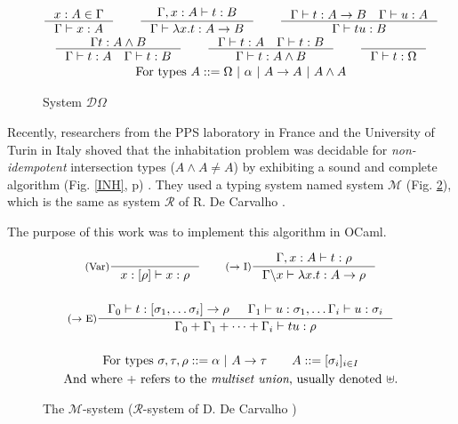 \documentclass{article}
\begin{document}
\begin{figure}
    \begin{mdframed}
        \begin{gather*}
        \inference[]{x : A \in \Gamma}{\Gamma \vdash x : A}
        \qquad
        \inference[]{\Gamma, x : A \vdash t : B}{\Gamma \vdash \lambda x.t : A \rightarrow B}
        \qquad
        \inference[]{\Gamma \vdash t : A \rightarrow B \quad \Gamma \vdash u : A}{\Gamma \vdash tu : B}
        \\
        \inference[]{\Gamma t : A \wedge B}{\Gamma \vdash t : A \quad \Gamma \vdash t : B}
        \qquad
        \inference[]{\Gamma \vdash t : A \quad \Gamma \vdash t : B}{\Gamma \vdash t : A \wedge B}
        \qquad
        \inference[]{}{\Gamma \vdash t : \Omega}
        \\ \text{For types } A ::= \Omega \ | \ \alpha \ | \ A \rightarrow A \ | \ A \wedge A
        \end{gather*}
    \end{mdframed}
    \caption{System $\mathcal{D}\Omega$}
    \label{SDO}
\end{figure}

Recently, researchers from the PPS laboratory in France and the University of Turin in Italy shoved that the inhabitation problem was decidable for \emph{non-idempotent} intersection types ($A\wedge A\neq A$) by exhibiting a sound and complete algorithm (Fig. \ref{INH}, p\pageref{INH}) \cite{Kes}. They used a typing system named system $\mathcal{M}$ (Fig. \ref{SM}), which is the same as system $\mathcal{R}$ of R. De Carvalho \cite{DeCarvalho}.

The purpose of this work was to implement this algorithm in OCaml.

\begin{figure}[h]
    \begin{mdframed}
        \begin{gather*}
        \inference[(Var)]{}{x : [\rho] \vdash x : \rho}
        \qquad
        \inference[($\rightarrow$ I)]{\Gamma, x : A \vdash t : \rho}{\Gamma \backslash x \vdash \lambda x.t : A \rightarrow \rho}
        \\ \\
        \inference[($\rightarrow$ E)]{\Gamma_0 \vdash t : [\sigma_1, \ldots \sigma_i] \rightarrow \rho 
            & \Gamma_1 \vdash u : \sigma_1, \ldots \Gamma_i \vdash u : \sigma_i}
        {\Gamma_0 + \Gamma_1 + \cdots + \Gamma_i \vdash tu : \rho}
        \\ \\
        \text{For types } \sigma, \tau, \rho ::= \alpha \ | \ A \rightarrow \tau \qquad A ::= [\sigma_i]_{i \in I}
        \\ \text{And where $+$ refers to the \emph{multiset union}, usually denoted $\uplus$.}
        \end{gather*}
    \end{mdframed}
    \caption{The  $\mathcal{M}$-system ($\mathcal{R}$-system of D. De Carvalho \cite{DeCarvalho})}
    \label{SM}
\end{figure}
\end{document}
